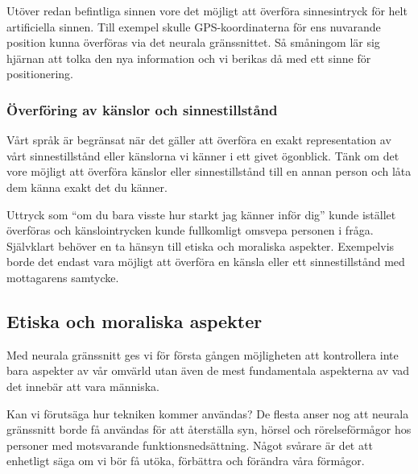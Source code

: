 \documentclass[12pt, a4paper]{article}
\begin{document}
Utöver redan befintliga sinnen vore det möjligt att överföra sinnesintryck för helt artificiella sinnen. Till exempel skulle GPS-koordinaterna för ens nuvarande position kunna överföras via det neurala gränssnittet. Så småningom lär sig hjärnan att tolka den nya information och vi berikas då med ett sinne för positionering.


\subsubsection{Överföring av känslor och sinnestillstånd}

Vårt språk är begränsat när det gäller att överföra en exakt representation av vårt sinnestillstånd eller känslorna vi känner i ett givet ögonblick. Tänk om det vore möjligt att överföra känslor eller sinnestillstånd till en annan person och låta dem känna exakt det du känner.

Uttryck som ``om du bara visste hur starkt jag känner inför dig'' kunde istället överföras och känslointrycken kunde fullkomligt omsvepa personen i fråga. Självklart behöver en ta hänsyn till etiska och moraliska aspekter. Exempelvis borde det endast vara möjligt att överföra en känsla eller ett sinnestillstånd med mottagarens samtycke.


\subsection{Etiska och moraliska aspekter}


Med neurala gränssnitt ges vi för första gången möjligheten att kontrollera inte bara aspekter av vår omvärld utan även de mest fundamentala aspekterna av vad det innebär att vara människa.

Kan vi förutsäga hur tekniken kommer användas? De flesta anser nog att neurala gränssnitt borde få användas för att återställa syn, hörsel och rörelseförmågor hos personer med motsvarande funktionsnedsättning. Något svårare är det att enhetligt säga om vi bör få utöka, förbättra och förändra våra förmågor.
\end{document}
